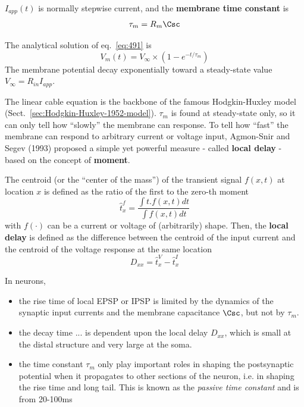 $I_{app}(t)$ is normally stepwise current, and the
{\bf membrane time constant} is
\begin{eqnarray}
  \label{eq:492}
  \tau_m = R_m\Csc 
\end{eqnarray}

The analytical solution of eq.~\eqref{eq:491} is
\begin{equation}
  \label{eq:926}
  V_m(t) = V_\infty\times(1-e^{-t/\tau_m})
\end{equation}
The membrane potential decay exponentially toward a steady-state value
$V_\infty=R_{in}I_{app}$.


\begin{framed}
  The linear cable equation is the backbone of the famous
  Hodgkin-Huxley model
  (Sect.~\ref{sec:Hodgkin-Huxley-1952-model}). $\tau_m$ is found at
  steady-state only, so it can only tell how ``slowly'' the membrane
  can response. To tell how ``fast'' the membrane can respond to
  arbitrary current or voltage input, Agmon-Snir and Segev (1993)
  proposed a simple yet powerful measure - called {\bf local delay} -
  based on the concept of {\bf moment}.

  The centroid (or the ``center of the mass'') of the transient signal
  $f(x,t)$ at location $x$ is defined as the ratio of the first to the
  zero-th moment
  \begin{equation}
    \label{eq:927}
    \hat{t}^f_x = \frac{\int t. f(x,t)dt}{\int f(x,t)dt}
  \end{equation}
  with $f(\cdot)$ can be a current or voltage of (arbitrarily)
  shape. Then, the {\bf local delay} is defined as the difference
  between the centroid of the input current and the centroid of the
  voltage response at the same location
  \begin{equation}
    \label{eq:928}
    D_{xx} = \hat{t}^V_x-\hat{t}^I_x
  \end{equation}
\end{framed}

In neurons, 
\begin{itemize}
\item the rise time of local EPSP or IPSP is limited by the dynamics
  of the synaptic input currents and the membrane capacitance $\Csc$,
  but not by $\tau_m$.
\item the decay time ... is dependent upon the local delay $D_{xx}$,
  which is small at the distal structure and very large at the soma. 
\item the time constant $\tau_m$ only play important roles in shaping
  the postsynaptic potential when it propagates to other sections of
  the neuron, i.e. in shaping the rise time and long tail. This is
  known as the {\it passive time constant} and is from 20-100ms
\end{itemize}

